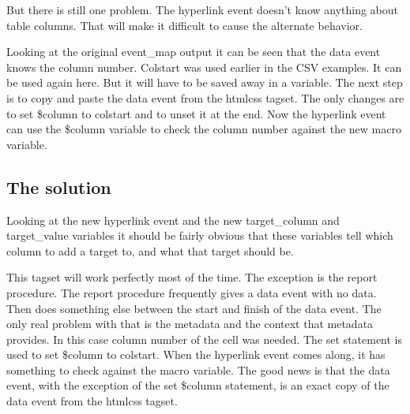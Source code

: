 But there is still one problem. The hyperlink event doesn't know anything about
table columns.  That will make it difficult to cause the alternate behavior.

Looking at the original event\_map output it can be seen that the data event knows
the column number.  Colstart was used earlier in the CSV examples.  It can be used
again here.  But it will have to be saved away in a variable.  The next step
is to copy and paste the data event from the htmlcss tagset.  The only changes are
to set \$column to colstart and to unset it at the end.  Now the hyperlink event
can use the \$column variable to check the column number against the new macro 
variable.

\subsection{The solution}

Looking at the new hyperlink event and the new target\_column and target\_value
variables it should be fairly obvious that these variables tell which column to
add a target to, and what that target should be.


This tagset will work perfectly most of the time.  The exception is the report procedure.
The report procedure frequently
gives a data event with no data.  Then does something else between the start and
finish of the data event.  The only real problem with that is the metadata and the 
context that metadata provides.  In this case column number of the cell was needed.
The set statement is used to set \$column to colstart.  When the
hyperlink event comes along, it has something to check against the macro variable.
The good news is that the data event, with the exception of the set \$column statement,
is an exact copy of the data event from the htmlcss tagset.

